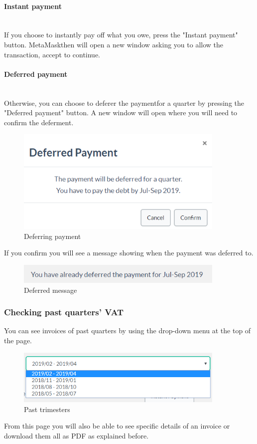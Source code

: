			\paragraph{Instant payment} \mbox{}\\

			If you choose to instantly pay off what you owe, press the "Instant 
			payment" button. MetaMask\glosp then will open a new window asking 
			you to allow the 
			transaction, accept to continue.
			\paragraph{Deferred payment} \mbox{}\\
			Otherwise, you can choose to deferer the payment\glosp for a quarter
			 by pressing the "Deferred payment" button. A new window will open 
			 where you will need to confirm the deferment.
			\begin{figure}[H]
				\includegraphics[width=10cm]{res/images/deferred_payment.png}
				\centering
				\caption{Deferring payment}
			\end{figure}
			\noindent If you confirm you will see a message showing when the
			payment was deferred to.
			\begin{figure}[H]
				\includegraphics[width=10cm]{res/images/deferred_message.png}
				\centering
				\caption{Deferred message}
			\end{figure}

%
		\subsubsection{Checking past quarters' VAT}
		You can see invoices of past quarters by using the drop-down 
		menu at the top of the page.
		\begin{figure}[H]
			\includegraphics[width=10cm]{res/images/past_trimesters.png}
			\centering
			\caption{Past trimesters}
		\end{figure}
		\noindent From this page you will also be able to see specific details 
		of an invoice or download them all as PDF as explained before.